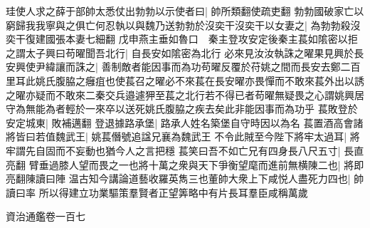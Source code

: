 珪使人求之薛于部帥太悉仗出勃勃以示使者曰|{
	帥所類翻使疏吏翻}
勃勃國破家亡以窮歸我我寧與之俱亡何忍執以與魏乃送勃勃於沒奕干沒奕干以女妻之|{
	為勃勃殺沒奕干復建國張本妻七細翻}
戊申燕主垂如魯口　秦主登攻安定後秦主萇如隂密以拒之謂太子興曰苟曜聞吾北行|{
	自長安如隂密為北行}
必來見汝汝執誅之曜果見興於長安興使尹緯讓而誅之|{
	善制敵者能因事而為功苟曜反覆於苻姚之間而長安去鄭二百里耳此姚氏腹脇之癰疽也使萇召之曜必不來萇在長安曜亦畏憚而不敢來萇外出以誘之曜亦疑而不敢來二秦交兵邉遽狎至萇之北行若不得已者苟曜無疑畏之心謂姚興居守為無能為者輕於一來卒以送死姚氏腹脇之疾去矣此非能因事而為功乎}
萇敗登於安定城東|{
	敗補邁翻}
登退據路承堡|{
	路承人姓名築堡自守時因以為名}
萇置酒高會諸將皆曰若值魏武王|{
	姚萇僭號追諡兄襄為魏武王}
不令此賊至今陛下將牢太過耳|{
	將牢謂先自固而不妄動也猶今人之言把穩}
萇笑曰吾不如亡兄有四身長八尺五寸|{
	長直亮翻}
臂垂過膝人望而畏之一也將十萬之衆與天下爭衡望麾而進前無横陳二也|{
	將即亮翻陳讀曰陣}
温古知今講論道藝收羅英雋三也董帥大衆上下咸悦人盡死力四也|{
	帥讀曰率}
所以得建立功業驅策羣賢者正望筭略中有片長耳羣臣咸稱萬歲

資治通鑑卷一百七
